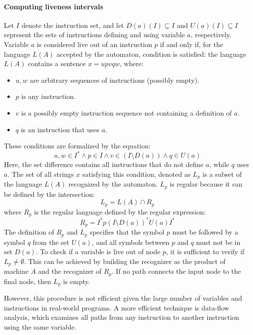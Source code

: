 \paragraph*{Computing liveness intervals}
Let $I$ denote the instruction set, and let $D(a)(I) \subseteq I$ and $U(a)(I) \subseteq I$ represent the sets of instructions defining and using variable $a$, respectively.
Variable $a$ is considered live out of an instruction $p$ if and only if, for the language $L(A)$ accepted by the automaton, condition is satisfied:
the language $L(A)$ contains a sentence $x = u p v q w$, where:
\begin{itemize}
    \item $u, w$ are arbitrary sequences of instructions (possibly empty). 
    \item $p$ is any instruction. 
    \item $v$ is a possibly empty instruction sequence not containing a definition of $a$. 
    \item $q$ is an instruction that uses $a$. 
\end{itemize}
These conditions are formalized by the equation:
\[ u, w \in I^{\ast} \land p \in I \land v \in \left( I \setminus D\left( a \right) \right) \land q \in U\left( a \right) \]
Here, the set difference contains all instructions that do not define $a$, while $q$ uses $a$.
The set of all strings $x$ satisfying this condition, denoted as $L_p$ is a subset of the language $L(A)$ recognized by the automaton.
$L_p$  is regular because it can be defined by the intersection:
\[ L_p = L(A) \cap R_p \]
where $R_p$ is the regular language defined by the regular expression:
\[ R_p = I^{\ast} p \left( I \setminus D \left( a \right) \right)^{\ast} U \left( a \right) I^{\ast} \]
The definition of $R_p$ and $L_p$ specifies that the symbol $p$ must be followed by a symbol $q$ from the set $U\left( a \right)$, and all symbols between $p$ and $q$ must not be in set $D\left( a \right)$.
To check if a variable is live out of node $p$, it is sufficient to verify if $L_p \neq \emptyset$. 
This can be achieved by building the recognizer as the product of machine $A$ and the recognizer of $R_p$.
If no path connects the input node to the final node, then $L_p$ is empty.

However, this procedure is not efficient given the large number of variables and instructions in real-world programs. 
A more efficient technique is data-flow analysis, which examines all paths from any instruction to another instruction using the same variable.

